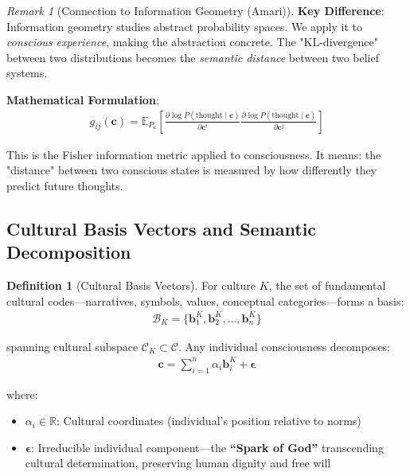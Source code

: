\documentclass[11pt,a4paper]{article}
\theoremstyle{definition}
\newtheorem{definition}{Definition}[section]
\theoremstyle{remark}
\newtheorem{remark}{Remark}[section]
\newcommand{\RR}{\mathbb{R}}
\newcommand{\CC}{\mathcal{C}}
\newcommand{\bb}{\mathbf{b}}
\newcommand{\cc}{\mathbf{c}}
\begin{document}
\begin{small}
\begin{remark}[Connection to Information Geometry (Amari)]
\textbf{Key Difference}: Information geometry studies abstract probability spaces. We apply it to \textit{conscious experience}, making the abstraction concrete. The "KL-divergence" between two distributions becomes the \textit{semantic distance} between two belief systems.

\textbf{Mathematical Formulation}:
\begin{align}
g_{ij}(\cc) = \mathbb{E}_{P_\cc}\left[\frac{\partial \log P(\text{thought} \mid \cc)}{\partial \cc^i} \frac{\partial \log P(\text{thought} \mid \cc)}{\partial \cc^j}\right]
\end{align}

This is the Fisher information metric applied to consciousness. It means: the "distance" between two conscious states is measured by how differently they predict future thoughts.
\end{remark}

\subsection{Cultural Basis Vectors and Semantic Decomposition}

\begin{definition}[Cultural Basis Vectors]
For culture \(K\), the set of fundamental cultural codes—narratives, symbols, values, conceptual categories—forms a basis:
\begin{align}
\mathcal{B}_K = \{\bb_1^K, \bb_2^K, \ldots, \bb_n^K\}
\end{align}

spanning cultural subspace \(\CC_K \subset \CC\). Any individual consciousness decomposes:
\begin{align}
\cc = \sum_{i=1}^n \alpha_i \bb_i^K + \boldsymbol{\epsilon}
\end{align}

where:
\begin{itemize}
\item \(\alpha_i \in \RR\): Cultural coordinates (individual's position relative to norms)
\item \(\boldsymbol{\epsilon}\): Irreducible individual component—the \textbf{``Spark of God''} transcending cultural determination, preserving human dignity and free will
\end{itemize}
\end{definition}

\begin{figure}[H]
\centering
{}
\end{figure}
\end{small}
\end{document}
